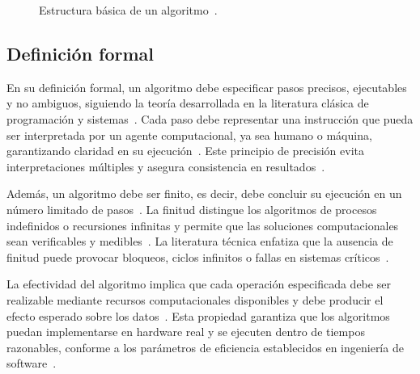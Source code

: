 \documentclass[12pt,twoside]{book}
\begin{document}
				\begin{figure}[hbt!]
					\centering
					\caption{Estructura básica de un algoritmo~\cite{Gaddis2022Starting,Stallings2021Computer}.}
					\label{fig:estructura-algoritmo}
				\end{figure}
		
			\subsection{Definición formal}
				\noindent
				En su definición formal, un algoritmo debe especificar pasos precisos, ejecutables y no ambiguos, siguiendo la teoría desarrollada en la literatura clásica de programación y sistemas~\cite{Tanenbaum2021Structured}. Cada paso debe representar una instrucción que pueda ser interpretada por un agente computacional, ya sea humano o máquina, garantizando claridad en su ejecución~\cite{Pressman2019Software}. Este principio de precisión evita interpretaciones múltiples y asegura consistencia en resultados~\cite{Sommerville2015Software}.
				
				Además, un algoritmo debe ser finito, es decir, debe concluir su ejecución en un número limitado de pasos~\cite{Gaddis2022Starting}. La finitud distingue los algoritmos de procesos indefinidos o recursiones infinitas y permite que las soluciones computacionales sean verificables y medibles~\cite{Stallings2021Computer}. La literatura técnica enfatiza que la ausencia de finitud puede provocar bloqueos, ciclos infinitos o fallas en sistemas críticos~\cite{Pressman2019Software}.
				
				La efectividad del algoritmo implica que cada operación especificada debe ser realizable mediante recursos computacionales disponibles y debe producir el efecto esperado sobre los datos~\cite{Tanenbaum2021Structured}. Esta propiedad garantiza que los algoritmos puedan implementarse en hardware real y se ejecuten dentro de tiempos razonables, conforme a los parámetros de eficiencia establecidos en ingeniería de software~\cite{Sommerville2015Software}.
			
\end{document}
